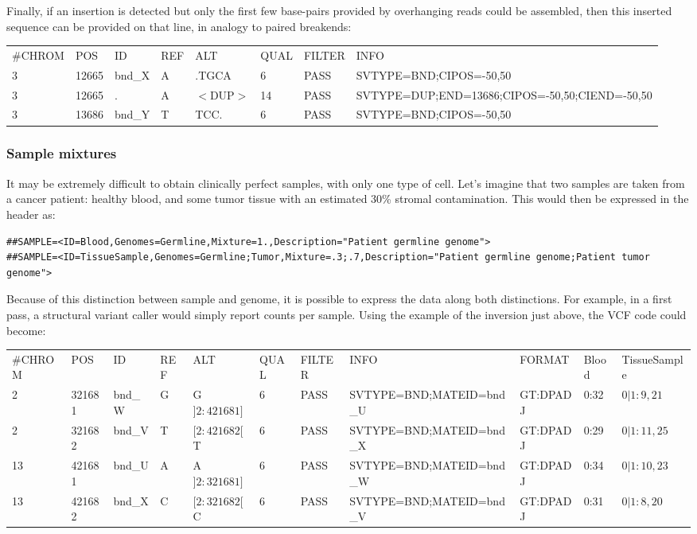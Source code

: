 \documentclass[8pt]{article}
\begin{document}
Finally, if an insertion is detected but only the first few base-pairs provided by overhanging reads could be assembled, then this inserted sequence can be provided on that line, in analogy to paired breakends:

\vspace{0.3cm}
\scriptsize
\begin{tabular}{ l l l l l l l l }
\#CHROM & POS & ID & REF & ALT & QUAL & FILTER & INFO \\
3 & 12665 & bnd\_X & A & .TGCA & 6 & PASS & SVTYPE=BND;CIPOS=-50,50 \\
3 & 12665 & . & A & $<$DUP$>$ & 14 & PASS & SVTYPE=DUP;END=13686;CIPOS=-50,50;CIEND=-50,50 \\
3 & 13686 & bnd\_Y & T & TCC. & 6 & PASS & SVTYPE=BND;CIPOS=-50,50 \\
\end{tabular}
\normalsize

\subsubsection{Sample mixtures}
It may be extremely difficult to obtain clinically perfect samples, with only one type of cell. Let's imagine that two samples are taken from a cancer patient: healthy blood, and some tumor tissue with an estimated 30\% stromal contamination. This would then be expressed in the header as:

\footnotesize
\begin{verbatim}
##SAMPLE=<ID=Blood,Genomes=Germline,Mixture=1.,Description="Patient germline genome">
##SAMPLE=<ID=TissueSample,Genomes=Germline;Tumor,Mixture=.3;.7,Description="Patient germline genome;Patient tumor genome">
\end{verbatim}
\normalsize

Because of this distinction between sample and genome, it is possible to express the data along both distinctions. For example, in a first pass, a structural variant caller would simply report counts per sample. Using the example of the inversion just above, the VCF code could become:

\vspace{0.3cm}
\tiny
\begin{flushleft}
\begin{tabular}{ l l l l l l l l l l l }
\#CHROM & POS & ID & REF & ALT & QUAL & FILTER & INFO & FORMAT & Blood & TissueSample\\
2 & 321681 & bnd\_W & G & G$]2:421681]$ & 6 & PASS & SVTYPE=BND;MATEID=bnd\_U & GT:DPADJ & 0:32 & $0|1:9,21$ \\
2 & 321682 & bnd\_V & T & $[2:421682[$T & 6 & PASS & SVTYPE=BND;MATEID=bnd\_X & GT:DPADJ & 0:29 & $0|1:11,25$ \\
13 & 421681 & bnd\_U & A & A$]2:321681]$ & 6 & PASS & SVTYPE=BND;MATEID=bnd\_W & GT:DPADJ & 0:34 & $0|1:10,23$ \\
13 & 421682 & bnd\_X & C & $[2:321682[$C & 6 & PASS & SVTYPE=BND;MATEID=bnd\_V & GT:DPADJ & 0:31 & $0|1:8,20$ \\
\end{tabular}
\end{flushleft}
\normalsize
\vspace{0.3cm}
\end{document}
